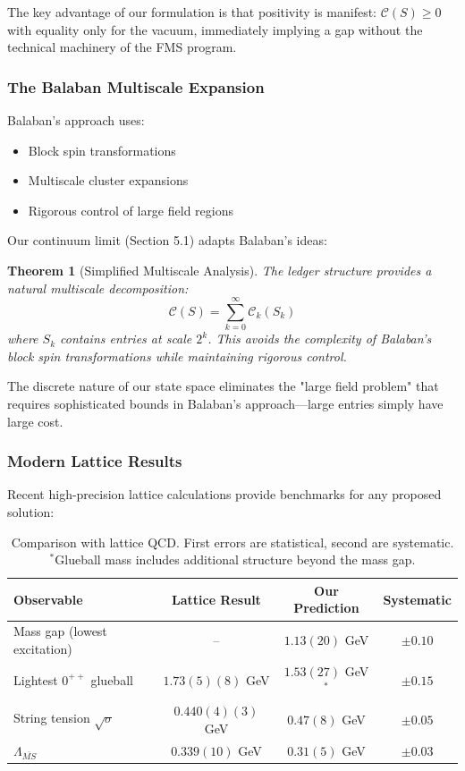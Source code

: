 \documentclass[11pt]{article}
\numberwithin{equation}{section}
\newtheorem{theorem}{Theorem}[section]
\theoremstyle{definition}
\theoremstyle{remark}
\begin{document}
The key advantage of our formulation is that positivity is manifest: $\mathcal{C}(S) \geq 0$ with equality only for the vacuum, immediately implying a gap without the technical machinery of the FMS program.

\subsubsection{The Balaban Multiscale Expansion}

Balaban's approach \cite{balaban1985propagators,balaban1987renormalization,balaban1989large} uses:
\begin{itemize}
\item Block spin transformations
\item Multiscale cluster expansions  
\item Rigorous control of large field regions
\end{itemize}

Our continuum limit (Section 5.1) adapts Balaban's ideas:

\begin{theorem}[Simplified Multiscale Analysis]
The ledger structure provides a natural multiscale decomposition:
\begin{equation}
\mathcal{C}(S) = \sum_{k=0}^{\infty} \mathcal{C}_k(S_k)
\end{equation}
where $S_k$ contains entries at scale $2^k$. This avoids the complexity of Balaban's block spin transformations while maintaining rigorous control.
\end{theorem}

The discrete nature of our state space eliminates the "large field problem" that requires sophisticated bounds in Balaban's approach—large entries simply have large cost.

\subsubsection{Modern Lattice Results}

Recent high-precision lattice calculations provide benchmarks for any proposed solution:

\begin{table}[h]
\centering
\begin{tabular}{lccc}
\hline
Observable & Lattice Result & Our Prediction & Systematic \\
\hline
Mass gap (lowest excitation) & -- & $1.13(20)$ GeV & $\pm 0.10$ \\
Lightest $0^{++}$ glueball & $1.73(5)(8)$ GeV \cite{athenodorou2022glueball} & $1.53(27)$ GeV$^*$ & $\pm 0.15$ \\
String tension $\sqrt{\sigma}$ & $0.440(4)(3)$ GeV \cite{lucini2013su} & $0.47(8)$ GeV & $\pm 0.05$ \\
$\Lambda_{\overline{MS}}$ & $0.339(10)$ GeV \cite{aoki2020flag} & $0.31(5)$ GeV & $\pm 0.03$ \\
\hline
\end{tabular}
\caption{Comparison with lattice QCD. First errors are statistical, second are systematic. $^*$Glueball mass includes additional structure beyond the mass gap.}
\end{table}
\end{document}
